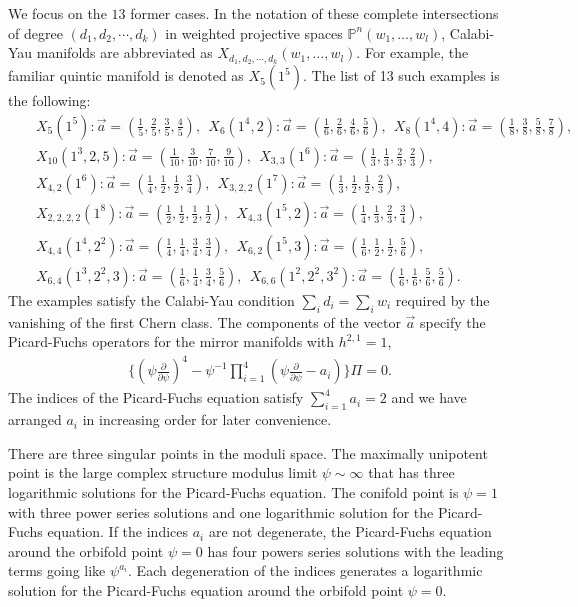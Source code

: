 \documentclass[12pt]{article}
\begin{document}
We focus on the $13$ former cases. In the notation of
\cite{Katz:1999} these complete intersections of degree
$(d_1,d_2,\cdots,d_k)$ in weighted projective spaces
$\mathbb{P}^n(w_1,\dots,w_l)$, Calabi-Yau manifolds are
abbreviated as $X_{d_1,d_2,\cdots,d_k}(w_1,\dots,w_l)$. For
example, the familiar quintic manifold is denoted as $X_{5}(1^5)$.
The list of 13 such examples is the following:
\begin{eqnarray}
&&X_{5}(1^5):
\vec{a}=(\frac{1}{5},\frac{2}{5},\frac{3}{5},\frac{4}{5}),~~
X_{6}(1^4,2):
\vec{a}=(\frac{1}{6},\frac{2}{6},\frac{4}{6},\frac{5}{6}),~~
 X_{8}(1^4,4):
\vec{a}=(\frac{1}{8},\frac{3}{8},\frac{5}{8},\frac{7}{8}),\nonumber \\
&& X_{10}(1^3,2,5):
\vec{a}=(\frac{1}{10},\frac{3}{10},\frac{7}{10},\frac{9}{10}),~~
X_{3,3}(1^6):
\vec{a}=(\frac{1}{3},\frac{1}{3},\frac{2}{3},\frac{2}{3}),\nonumber \\
&& X_{4,2}(1^6):
\vec{a}=(\frac{1}{4},\frac{1}{2},\frac{1}{2},\frac{3}{4}),
~~X_{3,2,2}(1^7):
\vec{a}=(\frac{1}{3},\frac{1}{2},\frac{1}{2},\frac{2}{3}),\nonumber \\
&& X_{2,2,2,2}(1^8):
\vec{a}=(\frac{1}{2},\frac{1}{2},\frac{1}{2},\frac{1}{2}),~~
X_{4,3}(1^5,2):
\vec{a}=(\frac{1}{4},\frac{1}{3},\frac{2}{3},\frac{3}{4}),
\nonumber \\
&&X_{4,4}(1^4,2^2):
\vec{a}=(\frac{1}{4},\frac{1}{4},\frac{3}{4},\frac{3}{4}),~~
X_{6,2}(1^5,3):
\vec{a}=(\frac{1}{6},\frac{1}{2},\frac{1}{2},\frac{5}{6}),
\nonumber \\
&&X_{6,4}(1^3,2^2,3):
\vec{a}=(\frac{1}{6},\frac{1}{4},\frac{3}{4},\frac{5}{6}),~~
X_{6,6}(1^2,2^2,3^2):
\vec{a}=(\frac{1}{6},\frac{1}{6},\frac{5}{6},\frac{5}{6}).
\nonumber
\end{eqnarray}
The examples satisfy the Calabi-Yau condition $\sum_i d_i=\sum_i
w_i$ required by the vanishing of the first Chern class. The
components of the vector $\vec{a}$ specify the Picard-Fuchs
operators for the mirror manifolds with $h^{2,1}=1$,
\begin{eqnarray} \label{PF-10-28-mh}
\{(\psi\frac{\partial}{\partial
\psi})^4-\psi^{-1}\prod_{i=1}^4(\psi\frac{\partial}{\partial
\psi}-a_i)\}\Pi=0.
\end{eqnarray}
The indices of the Picard-Fuchs equation satisfy $\sum_{i=1}^4
a_i=2$ and we have arranged $a_i$ in increasing order for later
convenience.

There are three singular points in the moduli space. The maximally
unipotent point is the large complex structure modulus limit
$\psi\sim \infty$ that has three logarithmic solutions for the
Picard-Fuchs equation. The conifold point is $\psi=1$ with three
power series solutions and one logarithmic solution for the
Picard-Fuchs equation. If the indices $a_i$ are not degenerate,
the Picard-Fuchs equation around the orbifold point $\psi=0$ has
four powers series solutions with the leading terms going like
$\psi^{a_i}$. Each degeneration of the indices generates a
logarithmic solution for the Picard-Fuchs equation around the
orbifold point $\psi=0$.
\end{document}
